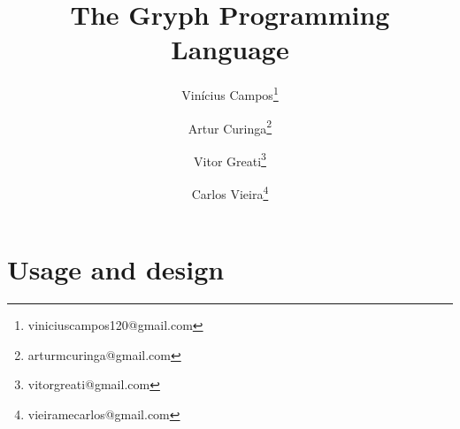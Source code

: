 \documentclass{article}
\title{The Gryph Programming Language}
\author{Vinícius Campos\thanks{viniciuscampos120@gmail.com} \and Artur Curinga\thanks{arturmcuringa@gmail.com} \and Vitor Greati\thanks{vitorgreati@gmail.com} \and Carlos Vieira\thanks{vieiramecarlos@gmail.com}}
\begin{document}
\maketitle


\tableofcontents

\newpage



\section{Usage and design}
\label{sec:usage}








\end{document}
